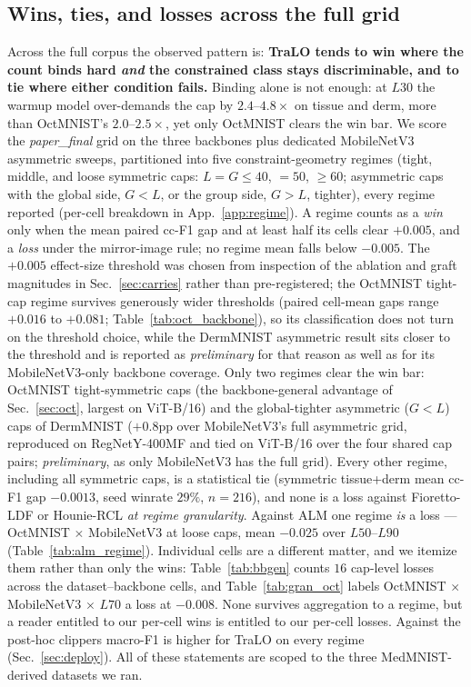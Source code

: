 \documentclass[10pt]{article}
\begin{document}
\subsection{Wins, ties, and losses across the full grid}
\label{sec:regime}

Across the full corpus the observed pattern is: \textbf{TraLO tends to win
where the count binds hard \emph{and} the constrained class stays
discriminable, and to tie where either condition fails.} Binding alone is not enough: at
$L30$ the warmup model over-demands the cap by $2.4$--$4.8\times$ on tissue
and derm, more than OctMNIST's $2.0$--$2.5\times$, yet only OctMNIST clears
the win bar. We score the \emph{paper\_final} grid on the three backbones
plus dedicated MobileNetV3 asymmetric sweeps, partitioned into five
constraint-geometry regimes (tight, middle, and loose symmetric caps:
$L{=}G{\le}40$, ${=}50$, ${\ge}60$; asymmetric caps with the global side,
$G{<}L$, or the group side, $G{>}L$, tighter), every regime reported
(per-cell breakdown in App.~\ref{app:regime}). A regime counts as a
\emph{win} only when the mean paired cc-F1 gap and at least half its
cells clear $+0.005$, and a \emph{loss} under the mirror-image rule; no
regime mean falls below $-0.005$. The $+0.005$ effect-size threshold
was chosen from inspection of the ablation and graft magnitudes in
Sec.~\ref{sec:carries} rather than pre-registered; the OctMNIST
tight-cap regime survives generously wider thresholds (paired cell-mean
gaps range $+0.016$ to $+0.081$; Table~\ref{tab:oct_backbone}), so its
classification does not turn on the threshold choice, while the
DermMNIST asymmetric result sits closer to the threshold and is
reported as \emph{preliminary} for that reason as well as for its
MobileNetV3-only backbone coverage. Only two regimes clear the win bar:
OctMNIST tight-symmetric caps (the backbone-general advantage of
Sec.~\ref{sec:oct}, largest on ViT-B/16) and the global-tighter
asymmetric ($G{<}L$) caps of DermMNIST ($+0.8$pp over MobileNetV3's full
asymmetric grid, reproduced on RegNet{\color{blue}Y-400MF} and tied on ViT{\color{blue}-B/16} over the four shared
cap pairs; \emph{preliminary}, as only MobileNetV3 has the full grid).
Every other regime, including all symmetric caps, is a statistical tie
(symmetric tissue+derm mean cc-F1 gap $-0.0013$, seed winrate $29\%$,
$n{=}216$), and none is a loss{\color{blue} against Fioretto-LDF or Hounie-RCL
\emph{at regime granularity}. Against ALM one regime \emph{is} a loss --- OctMNIST
$\times$ MobileNetV3 at loose caps, mean $-0.025$ over $L50$--$L90$
(Table~\ref{tab:alm_regime}).
Individual cells are a different matter, and we itemize them rather than only
the wins: Table~\ref{tab:bbgen} counts $16$ cap-level losses across the
dataset--backbone cells, and Table~\ref{tab:gran_oct} labels
OctMNIST$\,\times\,$MobileNetV3$\,\times\,L70$ a loss at $-0.008$. None survives
aggregation to a regime, but a reader entitled to our per-cell wins is entitled
to our per-cell losses}. Against the post-hoc clippers macro-F1 is
higher for TraLO on every regime (Sec.~\ref{sec:deploy}). All of these
statements are scoped to the three MedMNIST-derived datasets we ran.
\end{document}
